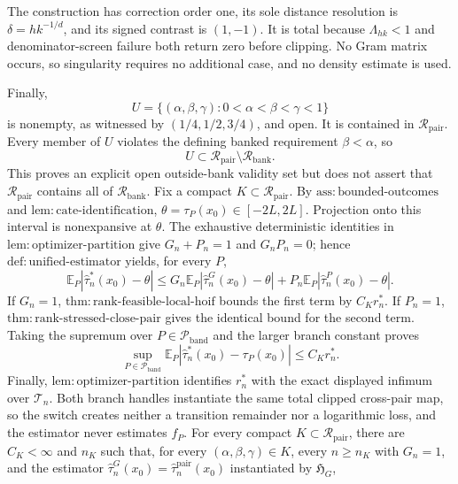 The construction has correction order one, its sole distance resolution is \(\delta=h k^{-1/d}\), and its signed contrast is \((1,-1)\).  It is total because \(\Lambda_{hk}<1\) and denominator-screen failure both return zero before clipping.  No Gram matrix occurs, so singularity requires no additional case, and no density estimate is used.

Finally,
\[
 U=\{(\alpha,\beta,\gamma):0<\alpha<\beta<\gamma<1\}
\]
is nonempty, as witnessed by \((1/4,1/2,3/4)\), and open.  It is contained in \(\mathcal R_{\mathrm{pair}}\).  Every member of \(U\) violates the defining banked requirement \(\beta<\alpha\), so
\[
 U\subset\mathcal R_{\mathrm{pair}}\setminus\mathcal R_{\mathrm{bank}}.
\]
This proves an explicit open outside-bank validity set but does not assert that \(\mathcal R_{\mathrm{pair}}\) contains all of \(\mathcal R_{\mathrm{bank}}\).
Fix a compact \(K\subset\mathcal R_{\mathrm{pair}}\).  By \(\mathrm{ass:bounded\mbox{-}outcomes}\) and \(\mathrm{lem:cate\mbox{-}identification}\), \(\theta=\tau_P(x_0)\in[-2L,2L]\).  Projection onto this interval is nonexpansive at \(\theta\).  The exhaustive deterministic identities in \(\mathrm{lem:optimizer\mbox{-}partition}\) give \(G_n+P_n=1\) and \(G_nP_n=0\); hence \(\mathrm{def:unified\mbox{-}estimator}\) yields, for every \(P\),
\[
 \mathbb E_P|\widehat\tau_n^*(x_0)-\theta|
 \leq G_n\mathbb E_P|\widehat\tau_n^G(x_0)-\theta|
      +P_n\mathbb E_P|\widehat\tau_n^P(x_0)-\theta|.
\]
If \(G_n=1\), \(\mathrm{thm:rank\mbox{-}feasible\mbox{-}local\mbox{-}hoif}\) bounds the first term by \(C_Kr_n^*\).  If \(P_n=1\), \(\mathrm{thm:rank\mbox{-}stressed\mbox{-}close\mbox{-}pair}\) gives the identical bound for the second term.  Taking the supremum over \(P\in\mathcal P_{\mathrm{band}}\) and the larger branch constant proves
\[
 \sup_{P\in\mathcal P_{\mathrm{band}}}
 \mathbb E_P|\widehat\tau_n^*(x_0)-\tau_P(x_0)|\leq C_Kr_n^*.
\]
Finally, \(\mathrm{lem:optimizer\mbox{-}partition}\) identifies \(r_n^*\) with the exact displayed infimum over \(\mathcal T_n\).  Both branch handles instantiate the same total clipped cross-pair map, so the switch creates neither a transition remainder nor a logarithmic loss, and the estimator never estimates \(f_P\).
For every compact \(K\subset\mathcal R_{\mathrm{pair}}\), there are \(C_K<\infty\) and \(n_K\) such that, for every \((\alpha,\beta,\gamma)\in K\), every \(n\geq n_K\) with \(G_n=1\), and the estimator \(\widehat\tau_n^G(x_0)=\widehat\tau_n^{\mathrm{pair}}(x_0)\) instantiated by \(\mathfrak H_G\),
